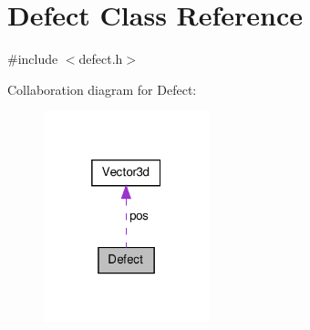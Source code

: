 \hypertarget{classDefect}{\section{\-Defect \-Class \-Reference}
\label{d5/d4f/classDefect}
}


{\ttfamily \#include $<$defect.\-h$>$}



\-Collaboration diagram for \-Defect\-:\nopagebreak
\begin{figure}[H]
\begin{center}
\leavevmode
\includegraphics[width=136pt]{d7/d09/classDefect__coll__graph}
\end{center}
\end{figure}
